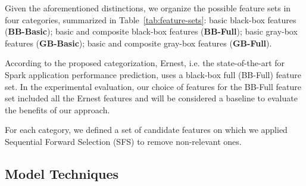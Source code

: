 \documentclass[a4paper, 10pt, conference]{ieeeconf}      %
\begin{document}

\noindent Given the aforementioned distinctions, we organize the possible feature sets in four categories, summarized in Table~\ref{tab:feature-sets}: basic black-box features (\textbf{BB-Basic}); basic and composite black-box features (\textbf{BB-Full}); basic gray-box features (\textbf{GB-Basic}); basic and composite gray-box features (\textbf{GB-Full}).


According to the proposed categorization, Ernest, i.e. the state-of-the-art for Spark application performance prediction, uses a black-box full (BB-Full) feature set. In the experimental evaluation, our choice of features for the BB-Full feature set included all the Ernest features and will be considered a baseline to evaluate the benefits of our approach.

For each category, we defined a set of candidate features on which we applied Sequential Forward Selection (SFS) \cite{kudo2000comparison} to remove non-relevant ones.



\subsection{Model Techniques}
\end{document}
